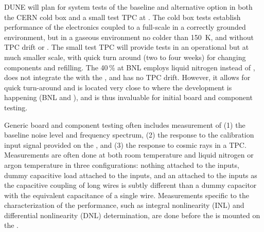 DUNE will plan for system tests of the baseline and alternative option in both the CERN cold box and a small test TPC at \fnal.  The cold box tests establish performance of the electronics coupled to a full-scale  in a correctly grounded environment, but in a gaseous environment no colder than \SI{150}{K}, and without TPC drift or .  The small test TPC will provide tests in an operational \lartpc but at much smaller scale, with quick turn around (two to four weeks) for changing components and refilling.  The \num{40}\,\%  at BNL employs liquid nitrogen instead of \lar, does not integrate the  with the , and has no TPC drift.  However, it allows for quick turn-around and is located very close to where the development is happening (BNL and \fnal), and is thus invaluable for initial board and component testing.

Generic board and component testing often includes measurement of (1) the baseline noise level and frequency spectrum, (2) the response to the calibration input signal provided on the , and (3) the response to cosmic rays in a TPC.  Measurements are often done at both room temperature and liquid nitrogen or argon temperature in three configurations: nothing attached to the inputs, dummy capacitive load attached to the inputs, and an  attached to the inputs as the capacitive coupling of long wires is subtly different than a dummy capacitor with the equivalent capacitance of a single wire.  Measurements specific to the characterization of the  performance, such as integral nonlinearity (INL) and differential nonlinearity (DNL) determination, are done before the  is mounted on the .

